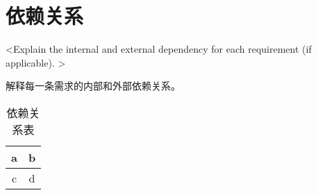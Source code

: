 \chapter{依赖关系}
<Explain the internal and external dependency for each requirement (if applicable). >

解释每一条需求的内部和外部依赖关系。

\begin{table}[htbp]
\centering
\caption{依赖关系表} \label{tab:simpletable}
\begin{tabular}{|c|c|}
    \hline
    a & b \\
    \hline
    c & d \\
    \hline
\end{tabular}
\end{table}
